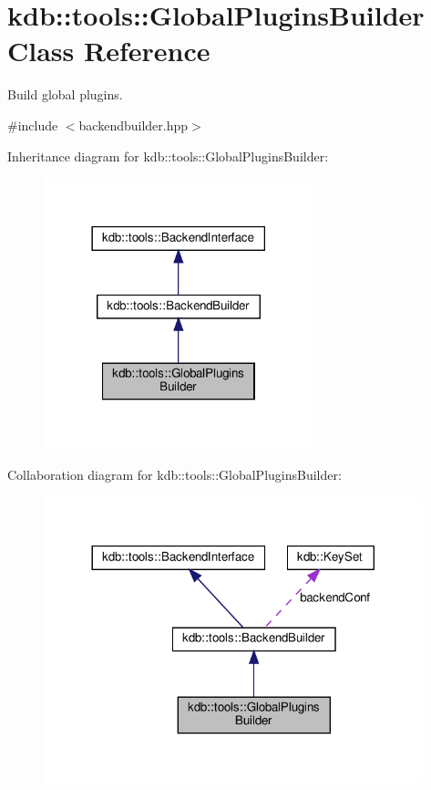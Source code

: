 \hypertarget{classkdb_1_1tools_1_1GlobalPluginsBuilder}{}\section{kdb\+:\+:tools\+:\+:Global\+Plugins\+Builder Class Reference}
\label{classkdb_1_1tools_1_1GlobalPluginsBuilder}


Build global plugins.  




{\ttfamily \#include $<$backendbuilder.\+hpp$>$}



Inheritance diagram for kdb\+:\+:tools\+:\+:Global\+Plugins\+Builder\+:
\nopagebreak
\begin{figure}[H]
\begin{center}
\leavevmode
\includegraphics[width=222pt]{classkdb_1_1tools_1_1GlobalPluginsBuilder__inherit__graph}
\end{center}
\end{figure}


Collaboration diagram for kdb\+:\+:tools\+:\+:Global\+Plugins\+Builder\+:
\nopagebreak
\begin{figure}[H]
\begin{center}
\leavevmode
\includegraphics[width=312pt]{classkdb_1_1tools_1_1GlobalPluginsBuilder__coll__graph}
\end{center}
\end{figure}
